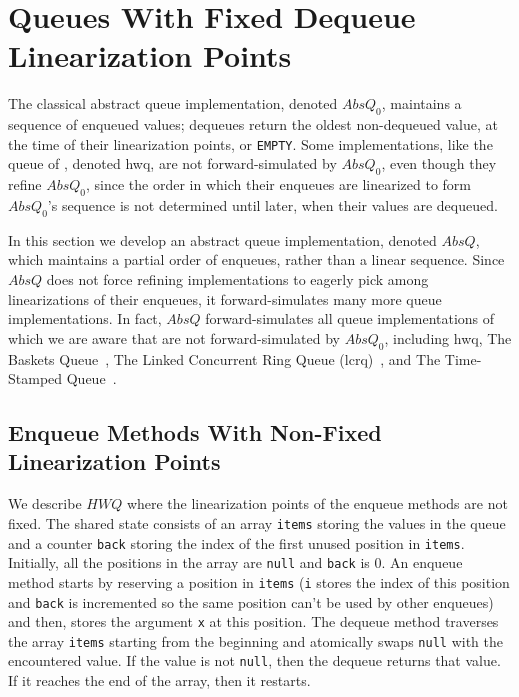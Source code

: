 \vspace{-3.5mm}
\section{Queues With Fixed Dequeue Linearization Points}\label{sec:queues}
\vspace{-1.5mm}

The classical abstract queue implementation, denoted $AbsQ_0$, maintains a
sequence of enqueued values; dequeues return the oldest non-dequeued value, at
the time of their linearization points, or {\tt EMPTY}. Some implementations,
like the queue of \citet{journals/toplas/HerlihyW90}, denoted {\sc hwq}, are not
forward-simulated by $AbsQ_0$, even though they refine $AbsQ_0$, since the order
in which their enqueues are linearized to form $AbsQ_0$’s sequence is not
determined until later, when their values are dequeued.

In this section we develop an abstract queue implementation, denoted $AbsQ$,
which maintains a partial order of enqueues, rather than a linear sequence.
Since $AbsQ$ does not force refining implementations to eagerly pick among
linearizations of their enqueues, it forward-simulates many more queue
implementations. In fact, $AbsQ$ forward-simulates all queue implementations of
which we are aware that are not forward-simulated by $AbsQ_0$, including {\sc
hwq}, The Baskets Queue~\cite{DBLP:conf/opodis/HoffmanSS07}, The Linked
Concurrent Ring Queue ({\sc lcrq})~\cite{DBLP:conf/ppopp/MorrisonA13}, and The
Time-Stamped Queue~\cite{DBLP:conf/popl/DoddsHK15}.


\vspace{-3.5mm}
\subsection{Enqueue Methods With Non-Fixed Linearization Points}
\vspace{-1mm}
We describe $\mathit{HWQ}$ where the linearization points of the enqueue methods are not fixed.
The shared state consists of an array {\tt items} storing the values in the queue and a counter {\tt back} storing the index of the first unused position in {\tt items}. Initially, all the positions in the array are {\tt null} and {\tt back} is 0.
An enqueue method starts by reserving a position in {\tt items} ({\tt i} stores the index of this position and {\tt back} is incremented so the same position can't be used by other enqueues) and then, stores the argument {\tt x} at this position. The dequeue method traverses the array {\tt items} starting from the beginning and atomically swaps {\tt null} with the encountered value. If the value is not {\tt null}, then the dequeue returns that value. If it reaches the end of the array, then it restarts.

